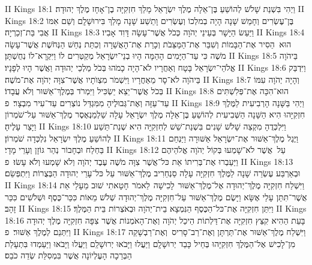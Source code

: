 II Kings 18:1	וַיְהִי בִּשְׁנַת שָׁלֹשׁ לְהוֹשֵׁעַ בֶּן־אֵלָה מֶלֶךְ יִשְׂרָאֵל מָלַךְ חִזְקִיָּה בֶן־אָחָז מֶלֶךְ יְהוּדָה׃
II Kings 18:2	בֶּן־עֶשְׂרִים וְחָמֵשׁ שָׁנָה הָיָה בְמלְכוֹ וְעֶשְׂרִים וָתֵשַׁע שָׁנָה מָלַךְ בִּירוּשָׁלָ͏ִם וְשֵׁם אִמּוֹ אֲבִי בַּת־זְכַרְיָה׃
II Kings 18:3	וַיַּעַשׂ הַיָּשָׁר בְּעֵינֵי יְהֹוָה כְּכֹל אֲשֶׁר־עָשָׂה דָּוִד אָבִיו׃
II Kings 18:4	הוּא  הֵסִיר אֶת־הַבָּמוֹת וְשִׁבַּר אֶת־הַמַּצֵּבֹת וְכָרַת אֶת־הָאֲשֵׁרָה וְכִתַּת נְחַשׁ הַנְּחֹשֶׁת אֲשֶׁר־עָשָׂה מֹשֶׁה כִּי עַד־הַיָּמִים הָהֵמָּה הָיוּ בְנֵי־יִשְׂרָאֵל מְקַטְּרִים לוֹ וַיִּקְרָא־לוֹ נְחֻשְׁתָּן׃
II Kings 18:5	בַּיהֹוָה אֱלֹהֵי־יִשְׂרָאֵל בָּטָח וְאַחֲרָיו לֹא־הָיָה כָמֹהוּ בְּכֹל מַלְכֵי יְהוּדָה וַאֲשֶׁר הָיוּ לְפָנָיו׃
II Kings 18:6	וַיִּדְבַּק בַּיהֹוָה לֹא־סָר מֵאַחֲרָיו וַיִּשְׁמֹר מִצְוֺתָיו אֲשֶׁר־צִוָּה יְהֹוָה אֶת־מֹשֶׁה׃
II Kings 18:7	וְהָיָה יְהֹוָה עִמּוֹ בְּכֹל אֲשֶׁר־יֵצֵא יַשְׂכִּיל וַיִּמְרֹד בְּמֶלֶךְ־אַשּׁוּר וְלֹא עֲבָדוֹ׃
II Kings 18:8	הוּא־הִכָּה אֶת־פְּלִשְׁתִּים עַד־עַזָּה וְאֶת־גְּבוּלֶיהָ מִמִּגְדַּל נוֹצְרִים עַד־עִיר מִבְצָר׃ {פ}
II Kings 18:9	וַיְהִי בַּשָּׁנָה הָרְבִיעִית לַמֶּלֶךְ חִזְקִיָּהוּ הִיא הַשָּׁנָה הַשְּׁבִיעִית לְהוֹשֵׁעַ בֶּן־אֵלָה מֶלֶךְ יִשְׂרָאֵל עָלָה שַׁלְמַנְאֶסֶר מֶלֶךְ־אַשּׁוּר עַל־שֹׁמְרוֹן וַיָּצַר עָלֶיהָ׃
II Kings 18:10	וַיִּלְכְּדֻהָ מִקְצֵה שָׁלֹשׁ שָׁנִים בִּשְׁנַת־שֵׁשׁ לְחִזְקִיָּה הִיא שְׁנַת־תֵּשַׁע לְהוֹשֵׁעַ מֶלֶךְ יִשְׂרָאֵל נִלְכְּדָה שֹׁמְרוֹן׃
II Kings 18:11	וַיֶּגֶל מֶלֶךְ־אַשּׁוּר אֶת־יִשְׂרָאֵל אַשּׁוּרָה וַיַּנְחֵם בַּחְלַח וּבְחָבוֹר נְהַר גּוֹזָן וְעָרֵי מָדָי׃
II Kings 18:12	עַל  אֲשֶׁר לֹא־שָׁמְעוּ בְּקוֹל יְהֹוָה אֱלֹהֵיהֶם וַיַּעַבְרוּ אֶת־בְּרִיתוֹ אֵת כּל־אֲשֶׁר צִוָּה מֹשֶׁה עֶבֶד יְהֹוָה וְלֹא שָׁמְעוּ וְלֹא עָשׂוּ׃ {פ}
II Kings 18:13	וּבְאַרְבַּע עֶשְׂרֵה שָׁנָה לַמֶּלֶךְ חִזְקִיָּה עָלָה סַנְחֵרִיב מֶלֶךְ־אַשּׁוּר עַל כּל־עָרֵי יְהוּדָה הַבְּצֻרוֹת וַיִּתְפְּשֵׂם׃
II Kings 18:14	וַיִּשְׁלַח חִזְקִיָּה מֶלֶךְ־יְהוּדָה אֶל־מֶלֶךְ־אַשּׁוּר  לָכִישָׁה  לֵאמֹר  חָטָאתִי שׁוּב מֵעָלַי אֵת אֲשֶׁר־תִּתֵּן עָלַי אֶשָּׂא וַיָּשֶׂם מֶלֶךְ־אַשּׁוּר עַל־חִזְקִיָּה מֶלֶךְ־יְהוּדָה שְׁלֹשׁ מֵאוֹת כִּכַּר־כֶּסֶף וּשְׁלֹשִׁים כִּכַּר זָהָב׃
II Kings 18:15	וַיִּתֵּן חִזְקִיָּה אֶת־כּל־הַכֶּסֶף הַנִּמְצָא בֵית־יְהֹוָה וּבְאֹצְרוֹת בֵּית הַמֶּלֶךְ׃
II Kings 18:16	בָּעֵת הַהִיא קִצַּץ חִזְקִיָּה אֶת־דַּלְתוֹת הֵיכַל יְהֹוָה וְאֶת־הָאֹמְנוֹת אֲשֶׁר צִפָּה חִזְקִיָּה מֶלֶךְ יְהוּדָה וַיִּתְּנֵם לְמֶלֶךְ אַשּׁוּר׃ {פ}
II Kings 18:17	וַיִּשְׁלַח מֶלֶךְ־אַשּׁוּר אֶת־תַּרְתָּן וְאֶת־רַב־סָרִיס  וְאֶת־רַבְשָׁקֵה מִן־לָכִישׁ אֶל־הַמֶּלֶךְ חִזְקִיָּהוּ בְּחֵיל כָּבֵד יְרוּשָׁלָ͏ִם וַיַּעֲלוּ וַיָּבֹאוּ יְרוּשָׁלַ͏ִם וַיַּעֲלוּ וַיָּבֹאוּ וַיַּעַמְדוּ בִּתְעָלַת הַבְּרֵכָה הָעֶלְיוֹנָה אֲשֶׁר בִּמְסִלַּת שְׂדֵה כֹבֵס׃
